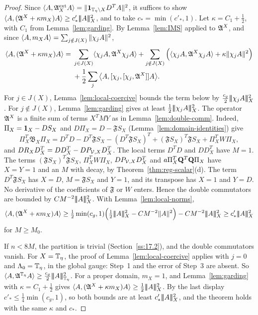 \begin{proof}
Since $\langle A,\mathfrak A^{\rm ext}_XA\rangle=\|\mathbf 1_{\mathbb T_\eta\setminus X}D^TA\|^2$, it suffices to show $\langle A,(\mathfrak A^X+\kappa m_X)A\rangle\ge c'_*|\!|\!|A|\!|\!|_X^2$, and to take $c_*=\min(c'_*,1)$. Let $\kappa=C_1+\frac12$, with $C_1$ from Lemma~\ref{lem:garding}. By Lemma~\ref{lem:IMS} applied to $\mathfrak A^X$, and since $\langle A,m_XA\rangle=\sum_{j\notin J(X)}\|\chi_jA\|^2$,
\[
\begin{aligned}
\langle A,(\mathfrak A^X+\kappa m_X)A\rangle={}&\sum_{j\in J(X)}\langle \chi_jA,\mathfrak A^X\chi_jA\rangle+\sum_{j\notin J(X)}\Big(\langle \chi_jA,\mathfrak A^X\chi_jA\rangle+\kappa\|\chi_jA\|^2\Big)\\
&+\frac12\sum_j\big\langle A,[\chi_j,[\chi_j,\mathfrak A^X]]A\big\rangle .
\end{aligned}
\]
For $j\in J(X)$, Lemma~\ref{lem:local-coercive} bounds the term below by $\frac{c_g}2|\!|\!|\chi_jA|\!|\!|_X^2$. For $j\notin J(X)$, Lemma~\ref{lem:garding} gives at least $\frac12|\!|\!|\chi_jA|\!|\!|_X^2$. The operator $\mathfrak A^X$ is a finite sum of terms $X^TMY$ as in Lemma~\ref{lem:double-comm}. Indeed, $\Pi_X=\mathbf 1_X-DS_X$ and $D\Pi_X=D-\mathfrak FS_X$ (Lemma~\ref{lem:domain-identities}) give
\[
\Pi_X^T\mathfrak B_X\Pi_X=D^TD-D^T\mathfrak FS_X-(D^T\mathfrak FS_X)^T+(\mathfrak FS_X)^T\mathfrak FS_X+\Pi_X^TW\Pi_X ,
\]
and $DR_XD^T_X=DD^T_X-DP_{\mathcal V,X}D^T_X$. The local terms $D^TD$ and $DD^T_X$ have $M=1$. The terms $(\mathfrak FS_X)^T\mathfrak FS_X$, $\Pi_X^TW\Pi_X$, $DP_{\mathcal V,X}D^T_X$ and $a\Pi_X^T\mathbf Q^T\mathbf Q\Pi_X$ have $X=Y=1$ and an $M$ with decay, by Theorem~\ref{thm:reg-scalar}(d). The term $D^T\mathfrak FS_X$ has $X=D$, $M=\mathfrak FS_X$ and $Y=1$, and its transpose has $X=1$ and $Y=D$. No derivative of the coefficients of $\mathfrak F$ or $W$ enters. Hence the double commutators are bounded by $CM^{-2}|\!|\!|A|\!|\!|_X^2$. With Lemma~\ref{lem:local-norms},
\[
\ip A{(\fA^X+\kappa m_X)A}\ge\tfrac12\min(c_g,1)\Big(\tfrac12\tn A_X^2-CM^{-2}\|A\|^2\Big)-CM^{-2}\tn A_X^2\ge c'_*\tn A_X^2
\]
for $M\ge M_0$.

If $n<8M$, the partition is trivial (Section~\ref{ss:17.2}), and the double commutators vanish. For $X=\mathbb T_\eta$, the proof of Lemma~\ref{lem:local-coercive} applies with $j=0$ and $\Lambda_0=\mathbb T_\eta$, in the global gauge: Step~1 and the error of Step~3 are absent. So $\langle A,\mathfrak A^{\mathbb T_\eta}A\rangle\ge\frac{c_g}2|\!|\!|A|\!|\!|_{\mathbb T_\eta}^2$. For a proper domain, $m_X=1$, and Lemma~\ref{lem:garding} with $\kappa=C_1+\frac12$ gives $\langle A,(\mathfrak A^X+\kappa m_X)A\rangle\ge\frac12|\!|\!|A|\!|\!|_X^2$. By the last display $c'_*\le\frac14\min(c_g,1)$, so both bounds are at least $c'_*|\!|\!|A|\!|\!|_X^2$, and the theorem holds with the same $\kappa$ and $c_*$.
\end{proof}

